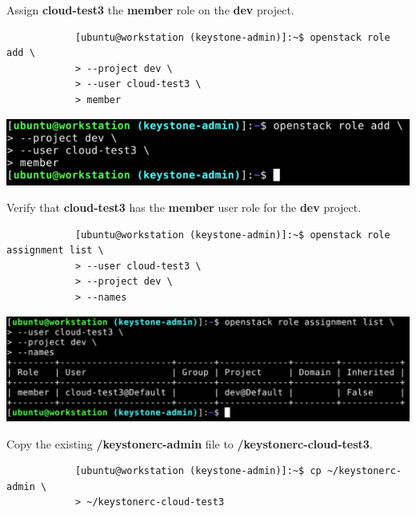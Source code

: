 \documentclass[letterpaper, 12pt]{article}
\begin{document}
\begin{enumerate}
    \begin{labstep}
        Assign \textbf{cloud-test3} the \textbf{member} role on the \textbf{dev} project.
        \begin{lstlisting}
            [ubuntu@workstation (keystone-admin)]:~$ openstack role add \
            > --project dev \
            > --user cloud-test3 \
            > member
        \end{lstlisting}

        \begin{center}
            \includegraphics[width=\linewidth]{images/part4/step7.png}
        \end{center}
    \end{labstep}

    \begin{labstep}
        Verify that \textbf{cloud-test3} has the \textbf{member} user role for the \textbf{dev} project.
        \begin{lstlisting}
            [ubuntu@workstation (keystone-admin)]:~$ openstack role assignment list \
            > --user cloud-test3 \
            > --project dev \
            > --names
        \end{lstlisting}

        \begin{center}
            \includegraphics[width=\linewidth]{images/part4/step8.png}
        \end{center}
    \end{labstep}

    \begin{labstep}
        Copy the existing \textbf{\texttildemid/keystonerc-admin} file to \textbf{\texttildemid/keystonerc-cloud-test3}.
        \begin{lstlisting}
            [ubuntu@workstation (keystone-admin)]:~$ cp ~/keystonerc-admin \
            > ~/keystonerc-cloud-test3
        \end{lstlisting}


\end{labstep}
\end{enumerate}
\end{document}
